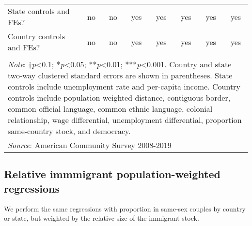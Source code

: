 \documentclass[
  11pt,
]{article}
\begin{document}
\begin{table}[H]
\begin{tabular}{@{\extracolsep{5pt}}lccccccc}
State controls and FEs? & no & no & yes & yes & yes & yes & yes \\ 
Country controls and FEs? & no & no & yes & yes & yes & yes & yes \\ 
\hline 
\hline \\[-1.8ex] 
\multicolumn{8}{l}{\parbox[t]{\textwidth}{\textit{Note}: †\textit{p}<0.1; *\textit{p}<0.05; **\textit{p}<0.01; ***\textit{p}<0.001. Country and state two-way clustered standard errors are shown in parentheses. State controls include unemployment rate and per-capita income. Country controls include population-weighted distance, contiguous border, common official language, common ethnic language, colonial relationship, wage differential, unemployment differential, proportion same-country stock, and democracy.}} \\ 
\multicolumn{8}{l}{\textit{Source}: American Community Survey 2008-2019} \\ 
\end{tabular} 
\end{table}

\newpage

\hypertarget{relative-immmigrant-population-weighted-regressions}{%
\subsection{Relative immmigrant population-weighted regressions}\label{relative-immmigrant-population-weighted-regressions}}

We perform the same regressions with proportion in same-sex couples by country or state, but weighted by the relative size of the immigrant stock.
\end{document}
